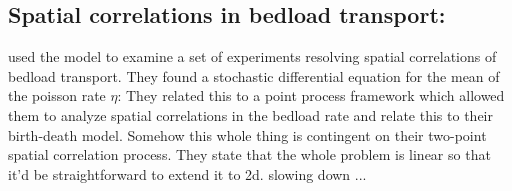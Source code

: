 \subsection{Spatial correlations in bedload transport: } 

\citet{Heyman2014} used the \citet{Ancey2014} model to examine a set of experiments resolving spatial correlations of bedload transport. 
They found a stochastic differential equation for the mean of the poisson rate $\eta$: 
They related this to a point process framework which allowed them to analyze spatial correlations in the bedload rate and relate this to their birth-death model. 
Somehow this whole thing is contingent on their two-point spatial correlation process. 
They state that the whole problem is linear so that it'd be straightforward to extend it to 2d. 
slowing down ... 




